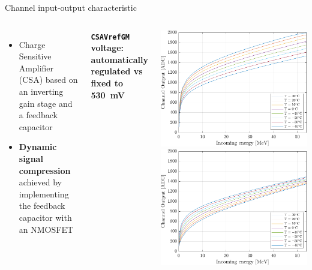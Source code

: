 \documentclass[aspectratio=169,xcolor=dvipsnames]{beamer}
\begin{document}
{\begin{frame}{Channel input-output characteristic}
\begin{columns}
        \vskip-0.2cm
        \begin{itemize}
            \item Charge Sensitive Amplifier (CSA) based on an inverting gain stage and a feedback capacitor
            \item \textbf{Dynamic signal compression} achieved by implementing the feedback capacitor with an NMOSFET
        \end{itemize}

            \addtolength{\leftmargini}{\labelsep}
            \vskip0.3cm
            \textbf{\texttt{CSAVrefGM} voltage: automatically regulated vs fixed to \SI{530}{\milli\volt}}\\
    
            \vskip-0.4cm
            \begin{center}
                \includegraphics[height=0.37\textheight]{images/temperature_effects/fdt_csavrefgm_auto_tau6_keV_0011.pdf}
                \includegraphics[height=0.37\textheight]{images/temperature_effects/fdt_csavrefgm_530mV_tau6_keV.pdf}
            \end{center}
    

\end{columns}
\end{frame}}
\end{document}
